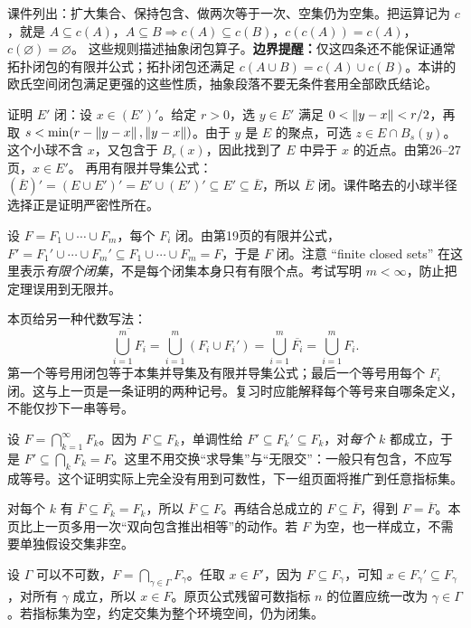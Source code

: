 课件列出：扩大集合、保持包含、做两次等于一次、空集仍为空集。把运算记为 $c$，就是
$A\subseteq c(A)$，$A\subseteq B\Rightarrow c(A)\subseteq c(B)$，$c(c(A))=c(A)$，$c(\varnothing)=\varnothing$。
这些规则描述抽象闭包算子。\textbf{边界提醒：}仅这四条还不能保证通常拓扑闭包的有限并公式；拓扑闭包还满足 $c(A\cup B)=c(A)\cup c(B)$。本讲的欧氏空间闭包满足更强的这些性质，抽象段落不要无条件套用全部欧氏结论。

证明 $E'$ 闭：设 $x\in(E')'$。给定 $r>0$，选 $y\in E'$ 满足 $0<\left\lVert y-x\right\rVert<r/2$，再取
$s<\min(r-\left\lVert y-x\right\rVert,\left\lVert y-x\right\rVert)$。由于 $y$ 是 $E$ 的聚点，可选 $z\in E\cap B_s(y)$。这个小球不含 $x$，又包含于 $B_r(x)$，因此找到了 $E$ 中异于 $x$ 的近点。由第26--27页，$x\in E'$。
再用有限并导集公式：$(\overline E)'=(E\cup E')'=E'\cup(E')'\subseteq E'\subseteq\overline E$，所以 $\overline E$ 闭。课件略去的小球半径选择正是证明严密性所在。

设 $F=F_1\cup\cdots\cup F_m$，每个 $F_i$ 闭。由第19页的有限并公式，$F'=F_1'\cup\cdots\cup F_m'\subseteq F_1\cup\cdots\cup F_m=F$，于是 $F$ 闭。注意 ``finite closed sets'' 在这里表示\emph{有限个闭集}，不是每个闭集本身只有有限个点。考试写明 $m<\infty$，防止把定理误用到无限并。

本页给另一种代数写法：
\[
 \overline{\bigcup_{i=1}^m F_i}
 =\bigcup_{i=1}^m(F_i\cup F_i')
 =\bigcup_{i=1}^m\overline{F_i}
 =\bigcup_{i=1}^m F_i.
\]
第一个等号用闭包等于本集并导集及有限并导集公式；最后一个等号用每个 $F_i$ 闭。这与上一页是一条证明的两种记号。复习时应能解释每个等号来自哪条定义，不能仅抄下一串等号。

设 $F=\bigcap_{k=1}^\infty F_k$。因为 $F\subseteq F_k$，单调性给 $F'\subseteq F_k'\subseteq F_k$，对\emph{每个} $k$ 都成立，于是 $F'\subseteq\bigcap_k F_k=F$。这里不用交换``求导集''与``无限交''：一般只有包含，不应写成等号。这个证明实际上完全没有用到可数性，下一组页面将推广到任意指标集。

对每个 $k$ 有 $\overline F\subseteq\overline{F_k}=F_k$，所以 $\overline F\subseteq F$。再结合总成立的 $F\subseteq\overline F$，得到 $F=\overline F$。本页比上一页多用一次``双向包含推出相等''的动作。若 $F$ 为空，也一样成立，不需要单独假设交集非空。

设 $\Gamma$ 可以不可数，$F=\bigcap_{\gamma\in\Gamma}F_\gamma$。任取 $x\in F'$，因为 $F\subseteq F_\gamma$，可知 $x\in F_\gamma'\subseteq F_\gamma$，对所有 $\gamma$ 成立，所以 $x\in F$。原页公式残留可数指标 $n$ 的位置应统一改为 $\gamma\in\Gamma$。若指标集为空，约定交集为整个环境空间，仍为闭集。


